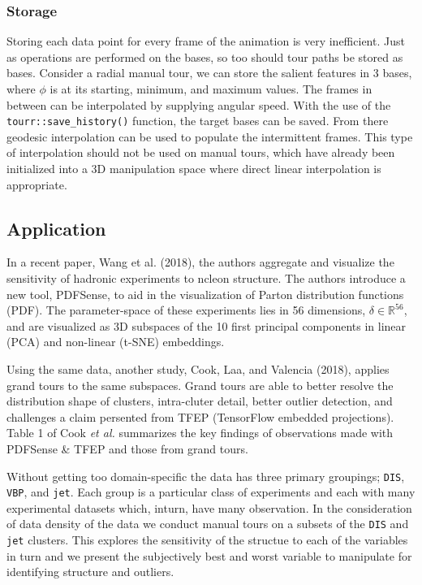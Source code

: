 \hypertarget{storage}{%
\subsubsection{Storage}\label{storage}}

Storing each data point for every frame of the animation is very inefficient. Just as operations are performed on the bases, so too should tour paths be stored as bases. Consider a radial manual tour, we can store the salient features in 3 bases, where \(\phi\) is at its starting, minimum, and maximum values. The frames in between can be interpolated by supplying angular speed. With the use of the \texttt{tourr::save\_history()} function, the target bases can be saved. From there geodesic interpolation can be used to populate the intermittent frames. This type of interpolation should not be used on manual tours, which have already been initialized into a 3D manipulation space where direct linear interpolation is appropriate.

\hypertarget{sec:application}{%
\subsection{Application}\label{sec:application}}

In a recent paper, Wang et al. (2018), the authors aggregate and visualize the sensitivity of hadronic experiments to ncleon structure. The authors introduce a new tool, PDFSense, to aid in the visualization of Parton distribution functions (PDF). The parameter-space of these experiments lies in 56 dimensions, \(\delta \in \mathbb{R}^{56}\), and are visualized as 3D subspaces of the 10 first principal components in linear (PCA) and non-linear (t-SNE) embeddings.

Using the same data, another study, Cook, Laa, and Valencia (2018), applies grand tours to the same subspaces. Grand tours are able to better resolve the distribution shape of clusters, intra-cluter detail, better outlier detection, and challenges a claim persented from TFEP (TensorFlow embedded projections). Table 1 of Cook \emph{et al.} summarizes the key findings of observations made with PDFSense \& TFEP and those from grand tours.

Without getting too domain-specific the data has three primary groupings; \texttt{DIS}, \texttt{VBP}, and \texttt{jet}. Each group is a particular class of experiments and each with many experimental datasets which, inturn, have many observation. In the consideration of data density of the data we conduct manual tours on a subsets of the \texttt{DIS} and \texttt{jet} clusters. This explores the sensitivity of the structue to each of the variables in turn and we present the subjectively best and worst variable to manipulate for identifying structure and outliers.

